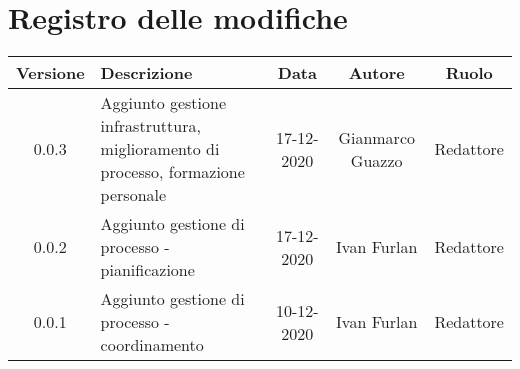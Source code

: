 \section*{Registro delle modifiche}

\begin{center}
	\begin{longtable}{|c|p{5cm}|c|c|c|}
	\hline
	\rowcolor{lighter-grayer}
	\textbf{Versione} & \textbf{Descrizione} & \textbf{Data} & \textbf{Autore} & \textbf{Ruolo} \\
	\hline
	\endfirsthead


	\hline
	0.0.3 & Aggiunto gestione infrastruttura, miglioramento di processo, formazione personale & 17-12-2020 & Gianmarco Guazzo & Redattore \\
	0.0.2 & Aggiunto gestione di processo - pianificazione & 17-12-2020 & Ivan Furlan & Redattore \\
	0.0.1 & Aggiunto gestione di processo - coordinamento & 10-12-2020 & Ivan Furlan & Redattore \\
	\hline

	\end{longtable}
\end{center}
